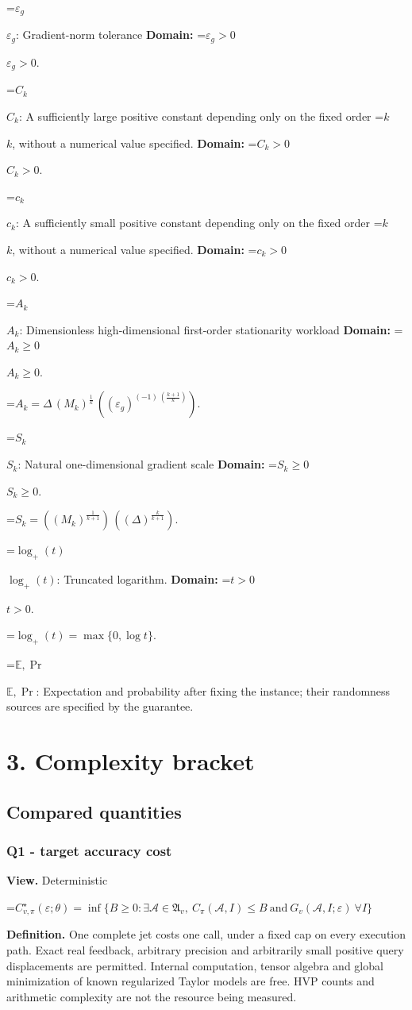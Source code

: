 \documentclass[10pt,a4paper]{article}
\newcommand{\AtlasMath}[1]{\par\begingroup\centering\setbox0=\hbox{$\displaystyle #1$}\ifdim\wd0>1.4\linewidth\typeout{ATLAS WIDE FORMULA: \the\wd0}\fi\ifdim\wd0>\linewidth\resizebox{\linewidth}{!}{\box0}\else\box0\fi\par\endgroup}
\newcommand{\AtlasInlineMath}[1]{\begingroup\setbox0=\hbox{$#1$}\ifdim\wd0>.4\linewidth\endgroup\AtlasMath{#1}\else\endgroup$#1$\fi}
\begin{document}
\AtlasInlineMath{\varepsilon_g}: Gradient-norm tolerance \textbf{Domain:} \AtlasInlineMath{\varepsilon_g>0}.

\AtlasInlineMath{C_k}: A sufficiently large positive constant depending only on the fixed order \AtlasInlineMath{k}, without a numerical value specified. \textbf{Domain:} \AtlasInlineMath{C_k>0}.

\AtlasInlineMath{c_k}: A sufficiently small positive constant depending only on the fixed order \AtlasInlineMath{k}, without a numerical value specified. \textbf{Domain:} \AtlasInlineMath{c_k>0}.

\AtlasInlineMath{A_k}: Dimensionless high-dimensional first-order stationarity workload \textbf{Domain:} \AtlasInlineMath{A_k\ge0}.


\AtlasMath{A_k=\Delta\,(M_k)^{\frac{1}{k}}\,((\varepsilon_g)^{(-1)\,(\frac{k+1}{k})}).}


\AtlasInlineMath{S_k}: Natural one-dimensional gradient scale \textbf{Domain:} \AtlasInlineMath{S_k\ge0}.


\AtlasMath{S_k=((M_k)^{\frac{1}{k+1}})\,((\Delta)^{\frac{k}{k+1}}).}


\AtlasInlineMath{\log_+(t)}: Truncated logarithm. \textbf{Domain:} \AtlasInlineMath{t>0}.


\AtlasMath{\log_+(t)=\max\{0,\log t\}.}


\AtlasInlineMath{\mathbb{E},\Pr}: Expectation and probability after fixing the instance; their randomness sources are specified by the guarantee.

\section{3. Complexity bracket}
\subsection{Compared quantities}
\subsubsection{Q1 - target accuracy cost}
\textbf{View.} Deterministic

\AtlasMath{C^\star_{v,\pi}(\varepsilon;\theta)=\inf\{B\ge0:\exists\mathcal A\in\mathfrak A_v,\ C_\pi(\mathcal A,I)\le B\ \text{and}\ G_v(\mathcal A,I;\varepsilon)\ \forall I\}}
\textbf{Definition.} One complete jet costs one call, under a fixed cap on every execution path. Exact real feedback, arbitrary precision and arbitrarily small positive query displacements are permitted. Internal computation, tensor algebra and global minimization of known regularized Taylor models are free. HVP counts and arithmetic complexity are not the resource being measured.
\end{document}
